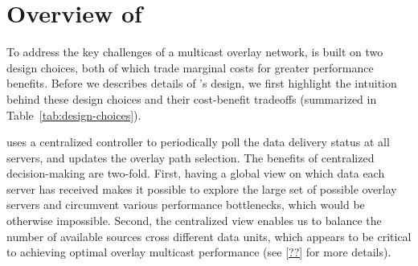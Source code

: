 \section{Overview of \name}
\label{sec:overview}

To address the key challenges of a multicast overlay network,
\name is built on two design choices, both of which
trade marginal costs for greater performance benefits. 
Before we describes details of \name's design, we first
highlight the intuition behind these design choices and
their cost-benefit tradeoffs 
(summarized in Table~\ref{tab:design-choices}).











\name uses a centralized controller to periodically poll 
the data delivery
status at all servers, and updates the overlay path selection.
The benefits of centralized decision-making are
two-fold. 
First, having a global view on which data each server has 
received makes it possible to explore the large set of possible 
overlay servers and circumvent various performance bottlenecks,
which would be otherwise impossible. 
Second, the centralized view enables us to 
balance the number of available sources 
cross different data units, which appears to be critical to 
achieving optimal overlay multicast performance (see 
\Section\ref{??} for more details).



